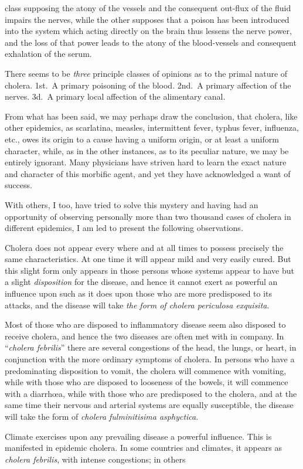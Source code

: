 class supposing the atony of the vessels and the consequent out-flux
of the fluid impairs the nerves, while the other supposes that a poison
has been introduced into the system which acting directly on the brain
thus lessens the nerve power, and the loss of that power leads to the
atony of the blood-vessels and consequent exhalation of the serum.

There seems to be \emph{three} principle classes of opinions as to the primal
nature of cholera. 1st.\ A primary poisoning of the blood. 2nd.\ A
primary affection of the nerves. 3d.\ A primary local affection of the
alimentary canal.

From what has been said, we may perhaps draw the conclusion, that
cholera, like other epidemics, as scarlatina, measles, intermittent fever,
typhus fever, influenza, etc., owes its origin to a cause having a uniform
origin, or at least a uniform character, while, as in the other instances,
as to its peculiar nature, we may be entirely ignorant. Many physicians
have striven hard to learn the exact nature and character of this morbific
agent, and yet they have acknowledged a want of success.

With others, I too, have tried to solve this mystery and having had
an opportunity of observing personally more than two thousand cases
of cholera in different epidemics, I am led to present the following observations.

Cholera does not appear every where and at all times to possess precisely
the same characteristics. At one time it will appear mild and
very easily cured. But this slight form only appears in those persons
whose systems appear to have but a slight \emph{disposition} for the disease,
and hence it cannot exert as powerful an influence upon such as it does
upon those who are more predisposed to its attacks, and the disease will
take \emph{the form of cholera periculosa exquisita}.

Most of those who are disposed to inflammatory disease seem also
disposed to receive cholera, and hence the two diseases are often met
with in company. In ``\emph{cholera febrilis}'' there are several congestions
of the head, the lungs, or heart, in conjunction with the more ordinary
symptoms of cholera. In persons who have a predominating disposition
to vomit, the cholera will commence with vomiting, while with
those who are disposed to looseness of the bowels, it will commence
with a diarrhœa, while with those who are predisposed to the cholera,
and at the same time their nervous and arterial systems are equally
susceptible, the disease will take the form of \emph{cholera fulminitisima
asphyctica}.

Climate exercises upon any prevailing disease a powerful influence.
This is manifested in epidemic cholera. In some countries and climates,
it appears as \emph{cholera febrilis}, with intense congestions; in others\endinput